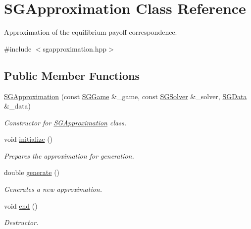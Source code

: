 \hypertarget{class_s_g_approximation}{\section{S\+G\+Approximation Class Reference}
\label{class_s_g_approximation}
}


Approximation of the equilibrium payoff correspondence.  




{\ttfamily \#include $<$sgapproximation.\+hpp$>$}

\subsection*{Public Member Functions}
\begin{DoxyCompactItemize}
\item 
\hypertarget{class_s_g_approximation_ade127071d4721d4686f065d5cb64fc35}{\hyperlink{class_s_g_approximation_ade127071d4721d4686f065d5cb64fc35}{S\+G\+Approximation} (const \hyperlink{class_s_g_game}{S\+G\+Game} \&\+\_\+game, const \hyperlink{class_s_g_solver}{S\+G\+Solver} \&\+\_\+solver, \hyperlink{class_s_g_data}{S\+G\+Data} \&\+\_\+data)}\label{class_s_g_approximation_ade127071d4721d4686f065d5cb64fc35}

\begin{DoxyCompactList}\small\item\em Constructor for \hyperlink{class_s_g_approximation}{S\+G\+Approximation} class. \end{DoxyCompactList}\item 
void \hyperlink{class_s_g_approximation_a6dbc44c8105eefdb1be4496e8a4a71c7}{initialize} ()
\begin{DoxyCompactList}\small\item\em Prepares the approximation for generation. \end{DoxyCompactList}\item 
double \hyperlink{class_s_g_approximation_aab259146004327089bd52375c51bd4ec}{generate} ()
\begin{DoxyCompactList}\small\item\em Generates a new approximation. \end{DoxyCompactList}\item 
void \hyperlink{class_s_g_approximation_a1956d20837fee2576590f63cafaa91dc}{end} ()
\begin{DoxyCompactList}\small\item\em Destructor. \end{DoxyCompactList}\end{DoxyCompactItemize}
